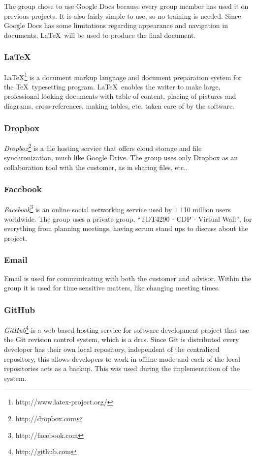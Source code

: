 \documentclass[11pt]{book}
\begin{document}
The group chose to use Google Docs because every group member has used it on previous projects. It is also fairly simple to use, so no training is needed. Since Google Docs has some limitations regarding appearance and navigation in documents, \LaTeX~will be used to produce the final document.

\subsubsection{\LaTeX}
\LaTeX\footnote{http://www.latex-project.org/} is a document markup language and document preparation system for the \TeX~typesetting program. \LaTeX~enables the writer to make large, professional looking documents with table of content, placing of pictures and diagrams, cross-references, making tables, etc. taken care of by the software. \cite{latex}

\subsubsection{Dropbox}
\emph{Dropbox}\footnote{http://dropbox.com} is a file hosting service that offers cloud storage and file synchronization, much like Google Drive. The group uses only Dropbox as an collaboration tool with the customer, as in sharing files, etc..

\subsubsection{Facebook}
\emph{Facebook}\footnote{http://facebook.com} is an online social networking service used by 1 110 million users worldwide.\cite{facebook} The group uses a private group, ``TDT4290 - CDP - Virtual Wall'', for everything from planning meetings, having scrum stand ups to discuss about the project.

\subsubsection{Email}
Email is used for communicating with both the customer and advisor. Within the group it is used for time sensitive matters, like changing meeting times.

\subsubsection{GitHub}
\emph{GitHub}\footnote{http://github.com} is a web-based hosting service for software development project that use the Git revision control system, which is a \gls{drcs}. Since Git is distributed every developer has their own local repository, independent of the centralized repository, this allows developers to work in offline mode and each of the local repositories acts as a backup. This was used during the implementation of the system.
\end{document}
